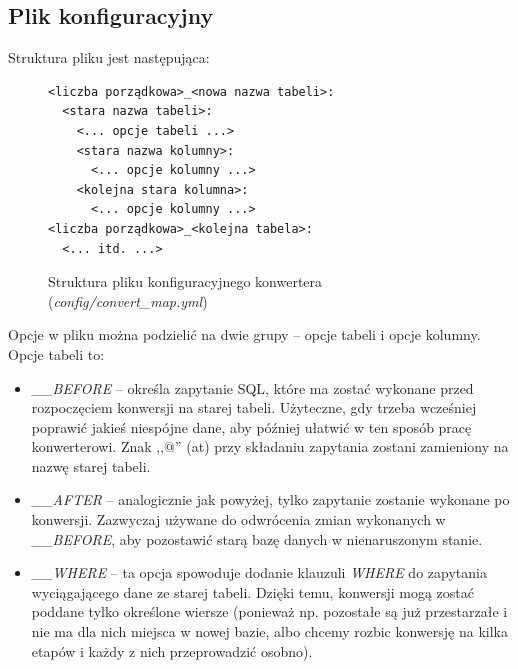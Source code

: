 \documentclass[a4paper,12pt,oneside]{report}
\begin{document}
\subsection{Plik konfiguracyjny}
\label{sub:convert-conf}

Struktura pliku jest następująca:
\begin{figure}[h]
\centering
\begin{verbatim}<liczba porządkowa>_<nowa nazwa tabeli>:
  <stara nazwa tabeli>:
    <... opcje tabeli ...>
    <stara nazwa kolumny>:
      <... opcje kolumny ...>
    <kolejna stara kolumna>:
      <... opcje kolumny ...>
<liczba porządkowa>_<kolejna tabela>:
  <... itd. ...>\end{verbatim}
\caption{Struktura pliku konfiguracyjnego konwertera (\emph{config/convert\_map.yml})\label{fig:convert_map}}
\end{figure}

Opcje w pliku można podzielić na dwie grupy -- opcje tabeli i opcje kolumny. Opcje tabeli to:
\begin{itemize}
  \item \emph{\_\_BEFORE} -- określa zapytanie SQL, które ma zostać wykonane przed rozpoczęciem konwersji na starej tabeli. Użyteczne, gdy trzeba wcześniej poprawić jakieś niespójne dane, aby później ułatwić w ten sposób pracę konwerterowi. Znak ,,@'' (at) przy składaniu zapytania zostani zamieniony na nazwę starej tabeli.
  \item \emph{\_\_AFTER} -- analogicznie jak powyżej, tylko zapytanie zostanie wykonane po konwersji. Zazwyczaj używane do odwrócenia zmian wykonanych w \emph{\_\_BEFORE}, aby pozostawić starą bazę danych w nienaruszonym stanie.
  \item \emph{\_\_WHERE} -- ta opcja spowoduje dodanie klauzuli \emph{WHERE} do zapytania wyciągającego dane ze starej tabeli. Dzięki temu, konwersji mogą zostać poddane tylko określone wiersze (ponieważ np. pozostałe są już przestarzałe i nie ma dla nich miejsca w nowej bazie, albo chcemy rozbic konwersję na kilka etapów i każdy z nich przeprowadzić osobno).
\end{itemize}
\end{document}
